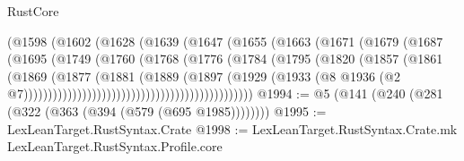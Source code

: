 \begin{lexlean}{RustCore}
\begin{coremodule}
                                        (@1598
                                          (@1602
                                            (@1628
                                              (@1639
                                                (@1647
                                                  (@1655
                                                    (@1663
                                                      (@1671
                                                        (@1679
                                                          (@1687
                                                            (@1695
                                                              (@1749
                                                                (@1760
                                                                  (@1768
                                                                    (@1776
                                                                      (@1784
                                                                        (@1795
                                                                          (@1820
                                                                            (@1857
                                                                              (@1861
                                                                                (@1869
                                                                                  (@1877
                                                                                    (@1881
                                                                                      (@1889
                                                                                        (@1897
                                                                                          (@1929
                                                                                            (@1933
                                                                                              (@8
                                                                                                @1936
                                                                                                (@2
                                                                                                  @7)))))))))))))))))))))))))))))))))))))))))))))))
@1994 := @5 (@141 (@240 (@281 (@322 (@363 (@394 (@579 (@695 @1985))))))))
@1995 := LexLeanTarget.RustSyntax.Crate
@1998 := LexLeanTarget.RustSyntax.Crate.mk LexLeanTarget.RustSyntax.Profile.core

\end{coremodule}
\end{lexlean}
